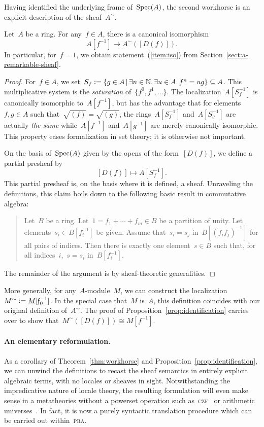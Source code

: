 \documentclass{ws-rv9x6}
\begin{document}
{Having identified the underlying frame of~$\mathrm{Spec}(A)$, the second workhorse is
an explicit description of the sheaf~$A^\sim$.

\begin{proposition}\label{prop:identification}
Let~$A$ be a ring. For any~$f \in A$, there is a canonical isomorphism
\[ A[f^{-1}] \longrightarrow A^\sim([D(f)]). \]
In particular, for~$f = 1$, we obtain statement~(\ref{item:iso}) from
Section~\ref{sect:a-remarkable-sheaf}.
\end{proposition}

\begin{proof}For~$f \in A$, we set~$S_f \vcentcolon= \{ g \in A \,|\, \exists n \in
\mathbb{N}\mathpunct{.} \exists u \in A\mathpunct{.} f^n = ug \} \subseteq A$. This multiplicative system is
the \emph{saturation} of~$\{ f^0, f^1, \ldots \}$. The localization~$A[S_f^{-1}]$
is canonically isomorphic to~$A[f^{-1}]$, but has the advantage that for
elements~$f,g \in A$ such that~$\sqrt{(f)} = \sqrt{(g)}$, the
rings~$A[S_f^{-1}]$ and~$A[S_g^{-1}]$ are actually \emph{the same}
while~$A[f^{-1}]$ and~$A[g^{-1}]$ are merely canonically isomorphic. This
property eases formalization in set theory; it is otherwise not important.

On the basis of~$\mathrm{Spec}(A)$ given by the opens of the form~$[D(f)]$, we define a partial
presheaf by
\[ [D(f)] \longmapsto A[S_f^{-1}]. \]
This partial presheaf is, on the basis where it is defined, a sheaf. Unraveling
the definitions, this claim boils down to the following basic result in
commutative algebra:
\begin{quote}
Let~$B$ be a ring. Let~$1 = f_1 + \cdots + f_m \in B$ be a partition of unity. Let
elements~$s_i \in B[f_i^{-1}]$ be given. Assume that~$s_i = s_j$
in~$B[(f_if_j)^{-1}]$ for all pairs of indices. Then there is exactly one
element~$s \in B$ such that, for all indices~$i$,~$s = s_i$ in~$B[f_i^{-1}]$.
\end{quote}
The remainder of the argument is by sheaf-theoretic generalities.
\end{proof}

More generally, for any~$A$-module~$M$, we can construct the
localization~$M^\sim \vcentcolon= \underline{M}[\mathfrak{f}_0^{-1}]$. In the special case
that~$M$ is~$A$, this definition coincides with our original definition
of~$A^\sim$. The proof of Proposition~\ref{prop:identification} carries over to
show that~$M^\sim([D(f)]) \cong M[f^{-1}]$.

\paragraph{An elementary reformulation.}
As a corollary of Theorem~\ref{thm:workhorse} and
Proposition~\ref{prop:identification}, we can unwind the definitions to recast
the sheaf semantics in entirely explicit algebraic terms, with no locales or
sheaves in sight. Notwithstanding the impredicative nature of locale theory,
the resulting formulation will even make sense in a metatheories without a
powerset operation such as~\textsc{czf}~\cite{crosilla:predicativity,aczel-rathjen:cst} or arithmetic
universes~\cite{maietti:au,vickers:sketches}. In
fact, it is now a purely syntactic translation procedure which can be carried
out within~\textsc{pra}.

}
\end{document}
